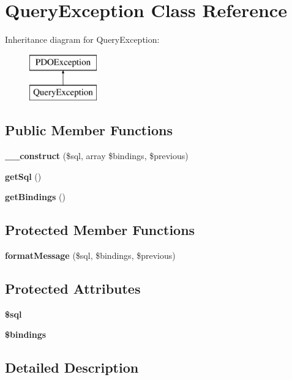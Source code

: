 \section{Query\+Exception Class Reference}
\label{class_illuminate_1_1_database_1_1_query_exception}
Inheritance diagram for Query\+Exception\+:\begin{figure}[H]
\begin{center}
\leavevmode
\includegraphics[height=2.000000cm]{class_illuminate_1_1_database_1_1_query_exception}
\end{center}
\end{figure}
\subsection*{Public Member Functions}
\begin{DoxyCompactItemize}
\item 
{\bf \+\_\+\+\_\+construct} (\$sql, array \$bindings, \$previous)
\item 
{\bf get\+Sql} ()
\item 
{\bf get\+Bindings} ()
\end{DoxyCompactItemize}
\subsection*{Protected Member Functions}
\begin{DoxyCompactItemize}
\item 
{\bf format\+Message} (\$sql, \$bindings, \$previous)
\end{DoxyCompactItemize}
\subsection*{Protected Attributes}
\begin{DoxyCompactItemize}
\item 
{\bf \$sql}
\item 
{\bf \$bindings}
\end{DoxyCompactItemize}


\subsection{Detailed Description}


